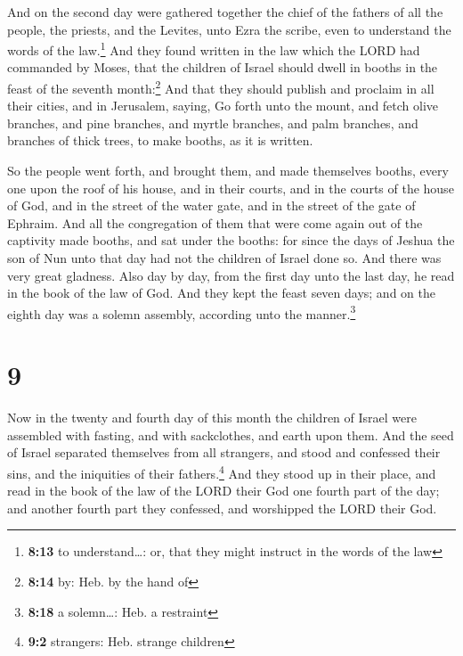  And on the second day were gathered together the chief
of the fathers of all the people, the priests, and the Levites, unto
Ezra the scribe, even to understand the words of the law.\footnote{\textbf{8:13}
  to understand\ldots: or, that they might instruct in the words of the
  law}  And they found written in the law which the LORD
had commanded by Moses, that the children of Israel should dwell in
booths in the feast of the seventh month:\footnote{\textbf{8:14} by:
  Heb. by the hand of}  And that they should publish and
proclaim in all their cities, and in Jerusalem, saying, Go forth unto
the mount, and fetch olive branches, and pine branches, and myrtle
branches, and palm branches, and branches of thick trees, to make
booths, as it is written.

 So the people went forth, and brought them, and made
themselves booths, every one upon the roof of his house, and in their
courts, and in the courts of the house of God, and in the street of the
water gate, and in the street of the gate of Ephraim. 
And all the congregation of them that were come again out of the
captivity made booths, and sat under the booths: for since the days of
Jeshua the son of Nun unto that day had not the children of Israel done
so. And there was very great gladness.  Also day by day,
from the first day unto the last day, he read in the book of the law of
God. And they kept the feast seven days; and on the eighth day was a
solemn assembly, according unto the manner.\footnote{\textbf{8:18} a
  solemn\ldots: Heb. a restraint}

\hypertarget{section-8}{%
\section{9}\label{section-8}}

 Now in the twenty and fourth day of this month the
children of Israel were assembled with fasting, and with sackclothes,
and earth upon them.  And the seed of Israel separated
themselves from all strangers, and stood and confessed their sins, and
the iniquities of their fathers.\footnote{\textbf{9:2} strangers: Heb.
  strange children}  And they stood up in their place, and
read in the book of the law of the LORD their God one fourth part of the
day; and another fourth part they confessed, and worshipped the LORD
their God.

